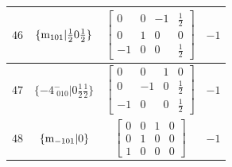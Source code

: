 \documentclass[fleqn,8pt]{jsarticle}
\begin{document}
\begin{longtable}{cccc}
$ 46 $ & $ \{{\rm m}_{101}|\frac{1}{2} 0 \frac{1}{2}\} $ & $ \begin{bmatrix} 0 & 0 & -1 & \frac{1}{2} \\ 0 & 1 & 0 & 0 \\ -1 & 0 & 0 & \frac{1}{2} \end{bmatrix} $ & $ -1 $ \\ \hline
$ 47 $ & $ \{-4^{-}_{\,\,010}|0 \frac{1}{2} \frac{1}{2}\} $ & $ \begin{bmatrix} 0 & 0 & 1 & 0 \\ 0 & -1 & 0 & \frac{1}{2} \\ -1 & 0 & 0 & \frac{1}{2} \end{bmatrix} $ & $ -1 $ \\ \hline
$ 48 $ & $ \{{\rm m}_{-101}|0\} $ & $ \begin{bmatrix} 0 & 0 & 1 & 0 \\ 0 & 1 & 0 & 0 \\ 1 & 0 & 0 & 0 \end{bmatrix} $ & $ -1 $ \\
\end{longtable}
\end{document}
